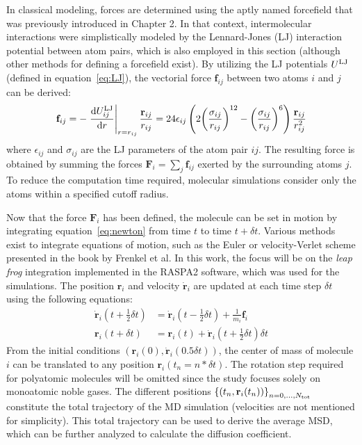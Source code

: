 \documentclass[main]{subfiles}
\begin{document}
In classical modeling, forces are determined using the aptly named forcefield that was previously introduced in Chapter 2.  In that context, intermolecular interactions were simplistically modeled by the Lennard-Jones (LJ) interaction potential between atom pairs, which is also employed in this section (although other methods for defining a forcefield exist). By utilizing the LJ potentials $U^{\text{LJ}}$ (defined in equation~\ref{eq:LJ}), the vectorial force $\mathbf{f}_{ij}$ between two atoms $i$ and $j$ can be derived:
\begin{equation}
  \mathbf{f}_{ij} = - \left.{\dfrac{\mathop{}\mathopen{}\mathrm{d} U^{\text{LJ}}_{ij}}{\mathop{}\mathopen{}\mathrm{d} r}}\right\rvert_{r=r_{ij}} \frac{\mathbf{r}_{ij}}{r_{ij}} = 24\epsilon_{ij}  \left(2{\left(\dfrac{\sigma_{ij}}{r_{ij}}\right)}^{12} - {\left(\dfrac{\sigma_{ij}}{r_{ij}}\right)}^{6}\right) \frac{\mathbf{r}_{ij}}{r_{ij}^2}
\end{equation}
where $\epsilon_{ij}$ and $\sigma_{ij}$ are the LJ parameters of the atom pair $ij$. The resulting force is obtained by summing the forces $\mathbf{F}_i=\sum_{j}\mathbf{f}_{ij}$ exerted by the surrounding atoms $j$. To reduce the computation time required, molecular simulations consider only the atoms within a specified cutoff radius.

Now that the force $\mathbf{F}_i$ has been defined,  the molecule can be set in motion by integrating equation~\ref{eq:newton} from time $t$ to time $t+\delta t$. Various methods exist to integrate equations of motion, such as the Euler or velocity-Verlet scheme presented in the book by Frenkel et al.\autocite{frenkel2001md} In this work, the focus will be on the \emph{leap frog} integration implemented in the RASPA2\autocite{dubbeldam2016} software, which was used for the simulations. The position $\mathbf{r}_i$ and velocity $\dot{\mathbf{r}}_i$ are updated at each time step $\delta t$ using the following equations:
\begin{equation}\label{eq:frogleap_integration}
  \begin{split}
    \dot{\mathbf{r}}_i\left(t+\tfrac{1}{2}\delta t\right) & = \dot{\mathbf{r}}_i\left(t-\tfrac{1}{2}\delta t\right) + \tfrac{1}{m_i}\mathbf{f}_i \\
    \mathbf{r}_i\left(t+\delta t\right) & = \mathbf{r}_i\left(t\right) + \dot{\mathbf{r}}_i\left(t+\tfrac{1}{2}\delta t\right)\delta t
  \end{split}
\end{equation}
From the initial conditions $(\mathbf{r}_i(0),\dot{\mathbf{r}}_i(0.5\delta t))$, the center of mass of molecule $i$ can be translated to any position $\mathbf{r}_i(t_n=n*\delta t)$. The rotation step required for polyatomic molecules will be omitted since the study focuses solely on monoatomic noble gases. The different positions ${\left\{\left(t_n,\mathbf{r}_i(t_n)\right)\right\}}_{n=0,\ldots,N_{\text{tot}}}$ constitute the total trajectory of the MD simulation (velocities are not mentioned for simplicity). This total trajectory can be used to derive the average MSD, which can be further analyzed to calculate the diffusion coefficient.
\end{document}
